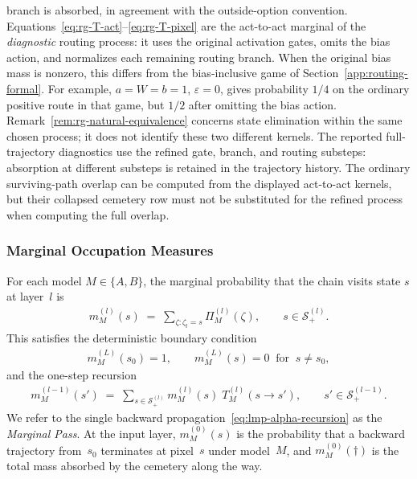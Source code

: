 \documentclass[twoside]{article}
\newcommand{\1}{\mathbf{1}}
\begin{document}
branch is absorbed, in agreement with the outside-option convention.
Equations~\eqref{eq:rg-T-act}--\eqref{eq:rg-T-pixel} are the act-to-act marginal of the \emph{diagnostic} routing process: it uses the original activation gates, omits the bias action, and normalizes each remaining routing branch. When the original bias mass is nonzero, this differs from the bias-inclusive game of Section~\ref{app:routing-formal}. For example, $a=W=b=1$, $\varepsilon=0$, gives probability $1/4$ on the ordinary positive route in that game, but $1/2$ after omitting the bias action. Remark~\ref{rem:rg-natural-equivalence} concerns state elimination within the same chosen process; it does not identify these two different kernels. The reported full-trajectory diagnostics use
the refined gate, branch, and routing substeps: absorption at different substeps
is retained in the trajectory history. The ordinary surviving-path overlap can
be computed from the displayed act-to-act kernels, but their collapsed cemetery
row must not be substituted for the refined process when computing the full overlap.

\subsubsection{Marginal Occupation Measures}\label{sec:lmp-marginals}

For each model $M \in \{A,B\}$, the marginal probability that the chain visits state $s$ at
layer~$l$ is
\begin{align}\label{eq:lmp-alpha}
    m^{(l)}_M(s) \;=\; \sum_{\zeta: \zeta_l = s} \Pi^{(l)}_M(\zeta),
    \qquad s \in \mathcal{S}^{(l)}_+.
\end{align}
This satisfies the deterministic boundary condition
\begin{align}\label{eq:lmp-alpha-boundary}
    m^{(L)}_M(s_0) = 1, \qquad m^{(L)}_M(s) = 0 \;\;\text{for}\;\; s \neq s_0,
\end{align}
and the one-step recursion
\begin{align}\label{eq:lmp-alpha-recursion}
    m^{(l-1)}_M(s') \;=\; \sum_{s \in \mathcal{S}^{(l)}_+} m^{(l)}_M(s)\; T^{(l)}_M(s \to s'),
    \qquad s' \in \mathcal{S}^{(l-1)}_+.
\end{align}
We refer to the single backward propagation~\eqref{eq:lmp-alpha-recursion} as the \emph{Marginal
Pass}.  At the input layer, $m^{(0)}_M(s)$ is the probability that a backward trajectory from~$s_0$
terminates at pixel~$s$ under model~$M$, and $m^{(0)}_M(\dagger)$ is the total mass absorbed by the
cemetery along the way.
\end{document}
